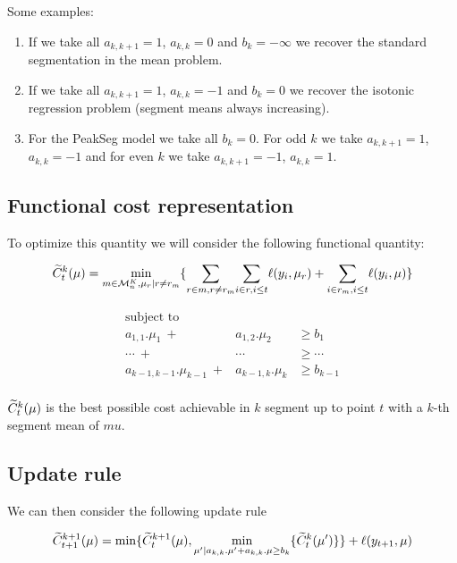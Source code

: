 \documentclass{article}
\begin{document}
Some examples:
\begin{enumerate}
\item If we take all $a_{k,k+1} =1$, $a_{k,k}=0$ and $b_{k} = - \infty$ we recover the standard segmentation in the mean problem.
\item If we take all $a_{k,k+1} =1$, $a_{k,k}=-1$ and $b_{k} = 0$ we
  recover the isotonic regression problem (segment means always
  increasing).
\item For the PeakSeg model we take all $b_{k} = 0$. For odd $k$ we
  take $a_{k,k+1} =1$, $a_{k,k}=-1$ and for even $k$ we take
  $a_{k,k+1} =-1$, $a_{k,k}=1$.
\end{enumerate}

\subsection{Functional cost representation}
To optimize this quantity we will consider the following functional quantity:

\begin{equation}
\widetilde{C}^k_t(\mu) =  \underset{m \in \mathcal{M}^K_n, \mu_r |  r \neq r_m}{\min} 
		\{ 
		   \underset{r \in m, r \neq r_m}{\sum} 
		   \underset{i \in r, i \leq t  }{\sum} \ell(y_i, \mu_{r}) 
		+ 
		   \underset{i \in r_m, i \leq t}{\sum} \ell(y_i, \mu)
		\}  
\end{equation}



\begin{eqnarray*}
\text{subject to} \\
a_{1,1}. \mu_1 \ + & a_{1,2}. \mu_2  & \geq  b_1 \\
\cdots \ + & \cdots & \geq \cdots \\
a_{k-1,k-1}. \mu_{k-1} \ + &a_{k-1,k}. \mu_{k}  & \geq  b_{k-1} \\
\end{eqnarray*}

$\widetilde{C}^k_t(\mu)$ is the best possible cost achievable in $k$ segment up to point $t$ with a $k$-th
segment mean of $mu$.

\subsection{Update rule}
We can then consider the following update rule

\begin{equation}
\widetilde{C}^{k+1}_{t+1}(\mu) = \min \{ \widetilde{C}^{k+1}_{t}(\mu)  , \underset{\mu' | a_{k,k}. \mu' + a_{k,k}. \mu  \geq  b_{k}}{\min} \{ \widetilde{C}^{k}_{t}(\mu') \}  \} + \ell(y_{t+1}, \mu)
\end{equation}
\end{document}
